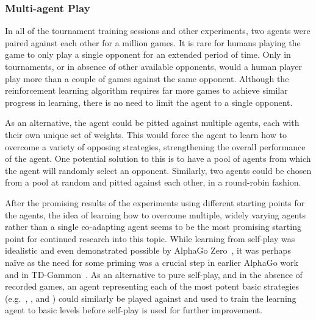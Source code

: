 
\subsubsection*{Multi-agent Play}
\label{sec:disc-future-rr}


In all of the tournament training sessions and other experiments,
two agents were paired against each other for a million games.
%
%
It is rare for humans playing the game to only play a single opponent
for an extended period of time.
%
Only in tournaments,
or in absence of other available opponents,
would a human player play more than a couple of games
against the same opponent.
%
Although the reinforcement learning algorithm requires far more games to
achieve similar progress in learning,
there is no need to limit the agent to a single opponent.

As an alternative,
the agent could be pitted against multiple agents,
each with their own unique set of
weights.
%
This would force the agent to learn how to overcome a variety of opposing
strategies,
strengthening the overall performance of the agent.
%
One potential solution to this is to have a pool of agents
from which the agent will randomly select an opponent.
%
Similarly,
two agents could be chosen from a pool at random and pitted against each
other,
in a round-robin fashion.

After the promising results of the experiments using different starting points
for the agents,
the idea of learning how to overcome multiple, widely varying agents
rather than a single co-adapting agent
seems to be the most promising starting point for continued research into this
topic.
%
While learning from self-play was idealistic
and even demonstrated possible by AlphaGo Zero~\cite{deepmind_alphago_zero},
it was perhaps naïve as
the need for some priming was a crucial step in earlier AlphaGo
work~\cite{deepmind_alphago} and in TD-Gammon~\cite{tdgammon}.
%
As an alternative to pure self-play,
and in the absence of recorded games,
an agent representing each of the most potent basic strategies
(e.g.\  \handmaxavg, \handmaxmin, and \handmaxposs)
could similarly be played against and used to train the learning agent
to basic levels before self-play is used for further improvement.

